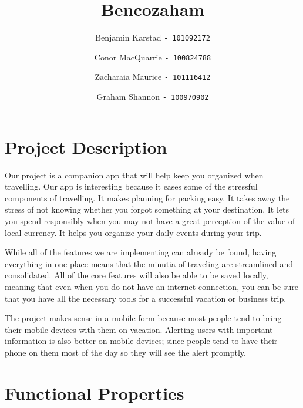 \documentclass[12pt]{article}
\title{Bencozaham}
\author{
Benjamin Karstad
\texttt{- 101092172}
\and
Conor MacQuarrie
\texttt{- 100824788}
\and
Zacharaia Maurice
\texttt{- 101116412}
\and
Graham Shannon
\texttt{- 100970902}
}
\begin{document}
	\maketitle

	\section*{Project Description}

	Our project is a companion app that will help keep you organized when travelling.
	Our app is interesting because it eases some of the stressful components of travelling.
	It makes planning for packing easy.
	It takes away the stress of not knowing whether you forgot something at your destination.
	It lets you spend responsibly when you may not have a great perception of the value of local currency.
	It helps you organize your daily events during your trip.

	While all of the features we are implementing can already be found,
	having everything in one place means that the minutia of traveling are streamlined and consolidated.
	All of the core features will also be able to be saved locally, meaning that even when you do not have an internet connection,
	you can be sure that you have all the necessary tools for a successful vacation or business trip.

	The project makes sense in a mobile form because most people tend to bring their mobile devices with them on vacation.
	Alerting users with important information is also better on mobile devices;
	since people tend to have their phone on them most of the day so they will see the alert promptly.

	\pagebreak

	\section*{Functional Properties}
\end{document}
